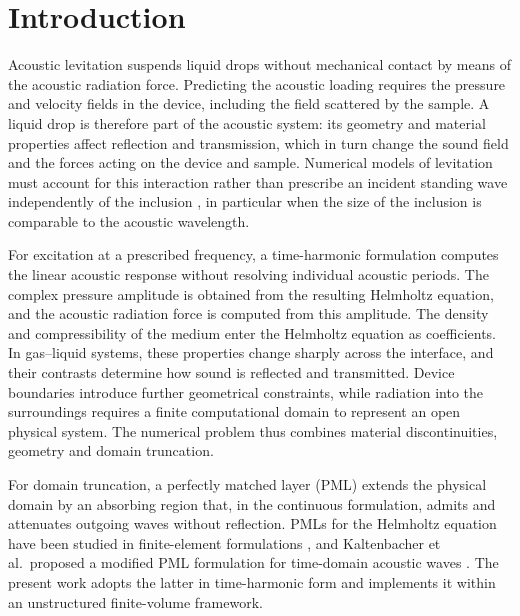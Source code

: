 \documentclass[final,12pt,nopreprintline,longtitle]{elsarticle}
\begin{document}
\linenumbers

\section{Introduction}
\label{sec:intro}

Acoustic levitation suspends liquid drops without mechanical contact by means
of the acoustic radiation force.  Predicting the acoustic loading requires the
pressure and velocity fields in the device, including the field scattered by
the sample.  A liquid drop is therefore part of the acoustic system: its
geometry and material properties affect reflection and transmission, which in
turn change the sound field and the forces acting on the device and sample.
Numerical models of levitation must account for this interaction rather than
prescribe an incident standing wave independently of the inclusion
\cite{andrade2019numerical}, in particular when the size of the inclusion is
comparable to the acoustic wavelength.

For excitation at a prescribed frequency, a time-harmonic formulation computes
the linear acoustic response without resolving individual acoustic periods.
The complex pressure amplitude is obtained from the resulting Helmholtz
equation, and the acoustic radiation force is computed from this amplitude.
The density and compressibility of the medium enter the Helmholtz equation as
coefficients.  In gas--liquid systems, these properties change sharply across
the interface, and their contrasts determine how sound is reflected and
transmitted.  Device boundaries introduce further geometrical constraints,
while radiation into the surroundings requires a finite computational domain
to represent an open physical system.  The numerical problem thus combines
material discontinuities, geometry and domain truncation.

For domain truncation, a perfectly matched layer (PML) extends the physical
domain by an absorbing region that, in the continuous formulation, admits and
attenuates outgoing waves without reflection.  PMLs for the
Helmholtz equation have been studied in finite-element formulations
\cite{Harari2000,Bermudez2007}, and Kaltenbacher et al.\ proposed a modified
PML formulation for time-domain acoustic waves
\cite{Kaltenbacher2013modified}.  The present work adopts the latter in
time-harmonic form and implements it within an unstructured finite-volume
framework.
\end{document}
